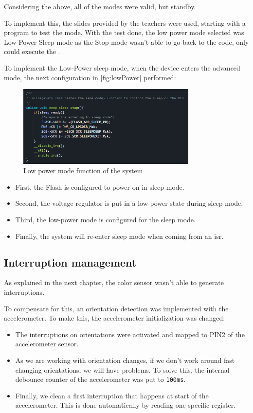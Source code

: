 Considering the above, all of the modes were valid, but standby.

To implement this, the slides provided by the teachers were used, starting with a program to test the mode. With the test done, the low power mode selected was Low-Power Sleep mode as the Stop mode wasn't able to go back 
to the code, only could execute the . 

To implement the Low-Power sleep mode, when the device enters the advanced mode, the next configuration in \autoref{fig:lowPower} performed:
\begin{figure}[H]
    \centering
    \includegraphics[width=0.8\textwidth]{images/5/Low Power.png}
    \caption{Low power mode function of the system}
    \label{fig:lowPower}
\end{figure}
\begin{itemize}
    \item First, the Flash is configured to power on in sleep mode.
    \item Second, the voltage regulator is put in a low-power state during sleep mode.
    \item Third, the low-power mode is configured for the sleep mode.
    \item Finally, the system will re-enter sleep mode when coming from an \acrshort{isr}.
\end{itemize}

\subsection{Interruption management}

As explained in the next chapter, the color sensor wasn't able to generate interruptions.

To compensate for this, an orientation detection was implemented with the accelerometer. To make this, the accelerometer initialization was changed:
\begin{itemize}
    \item The interruptions on orientations were activated and mapped to PIN2 of the accelerometer sensor.
    \item As we are working with orientation changes, if we don't work around fast changing orientations, we will have problems. To solve this, the internal debounce counter of the accelerometer was put to \texttt{100ms}.
    \item Finally, we clean a first interruption that happens at start of the accelerometer. This is done automatically by reading one specific register.
\end{itemize}

